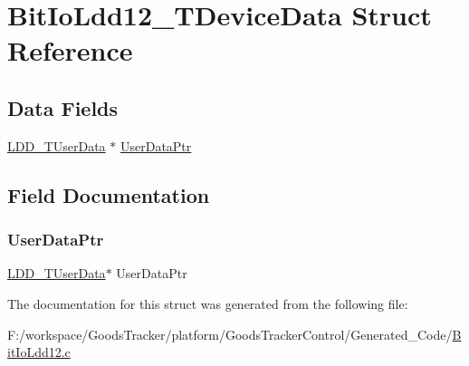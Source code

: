 \hypertarget{struct_bit_io_ldd12___t_device_data}{}\section{Bit\+Io\+Ldd12\+\_\+\+T\+Device\+Data Struct Reference}
\label{struct_bit_io_ldd12___t_device_data}
\subsection*{Data Fields}
\begin{DoxyCompactItemize}
\item 
\hyperlink{group___p_e___types__module_ga0b66a73f87238a782318aa0be7578e35}{L\+D\+D\+\_\+\+T\+User\+Data} $\ast$ \hyperlink{struct_bit_io_ldd12___t_device_data_a8e77b9d030b00c231823350a904e0f83}{User\+Data\+Ptr}
\end{DoxyCompactItemize}


\subsection{Field Documentation}
\mbox{\label{struct_bit_io_ldd12___t_device_data_a8e77b9d030b00c231823350a904e0f83}} 
\subsubsection{\texorpdfstring{User\+Data\+Ptr}{UserDataPtr}}
{\footnotesize\ttfamily \hyperlink{group___p_e___types__module_ga0b66a73f87238a782318aa0be7578e35}{L\+D\+D\+\_\+\+T\+User\+Data}$\ast$ User\+Data\+Ptr}



The documentation for this struct was generated from the following file\+:\begin{DoxyCompactItemize}
\item 
F\+:/workspace/\+Goods\+Tracker/platform/\+Goods\+Tracker\+Control/\+Generated\+\_\+\+Code/\hyperlink{_bit_io_ldd12_8c}{Bit\+Io\+Ldd12.\+c}\end{DoxyCompactItemize}
